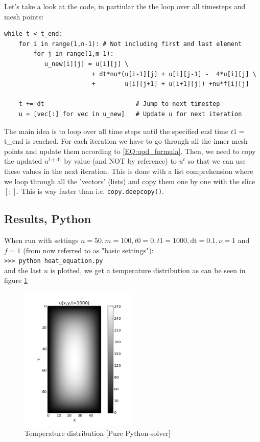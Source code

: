 \documentclass[a4paper]{article}
\begin{document}
Let's take a look at the code, in partiular the the loop over all timesteps and mesh points:

\begin{verbatim}
while t < t_end:
    for i in range(1,n-1): # Not including first and last element
        for j in range(1,m-1):
           u_new[i][j] = u[i][j] \
                        + dt*nu*(u[i-1][j] + u[i][j-1] -  4*u[i][j] \
                        +        u[i][j+1] + u[i+1][j]) +nu*f[i][j]
                        
    t += dt                         # Jump to next timestep
    u = [vec[:] for vec in u_new]   # Update u for next iteration
\end{verbatim}

The main idea is to loop over all time steps until the specified end time $t1 = $t\_end is reached. For each iteration we have to go through all the inner mesh points and update them according to \ref{EQ:upd_formula}. Then, we need to copy the updated $u^{t+\text{dt}}$ by value (and NOT by reference) to $u^t$ so that we can use these values in the next iteration. This is done with a list comprehension where we loop through all the 'vectors' (lists) and copy them one by one with the slice $[:]$. This is way faster than i.e. \texttt{copy.deepcopy()}.

\subsection*{Results, Python}
When run with settings $n=50, m=100, t0=0, t1=1000, \text{dt}=0.1, \nu=1$ and $f=1$ (from now referred to as "basic settings"):\\
\texttt{>>> python heat\_equation.py}\\
and the last $u$ is plotted, we get a temperature distribution as can be seen in figure \ref{FIG:purepython_res}

\begin{figure}[ht!]
\centering
\includegraphics[width=0.5\textwidth]{purepython_res.png}
\caption{\label{FIG:purepython_res}Temperature distribution [Pure Python-solver]}
\end{figure}
\end{document}
